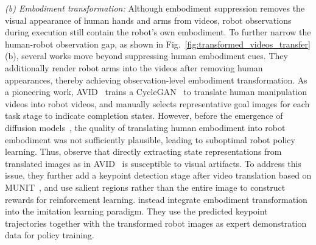 \documentclass[Afour,sageh,times]{sagej}
\begin{document}
\textit{(b) Embodiment transformation:} Although embodiment suppression removes the visual appearance of human hands and arms from videos, robot observations during execution still contain the robot's own embodiment. To further narrow the human-robot observation gap, as shown in Fig.~\ref{fig:transformed_videos_transfer}(b), several works move beyond suppressing human embodiment cues. They additionally render robot arms into the videos after removing human appearances, thereby achieving observation-level embodiment transformation. As a pioneering work, AVID~\citep{smith2020avid} trains a CycleGAN~\citep{zhu2017unpaired} to translate human manipulation videos into robot videos, and manually selects representative goal images for each task stage to indicate completion states. However, before the emergence of diffusion models~\citep{ho2020denoising,rombach2022high}, the quality of translating human embodiment into robot embodiment was not sufficiently plausible, leading to suboptimal robot policy learning. Thus, \cite{xiong2021learning} observe that directly extracting state representations from translated images as in AVID~\citep{smith2020avid} is susceptible to visual artifacts. To address this issue, they further add a keypoint detection stage after video translation based on MUNIT~\citep{huang2018multimodal}, and use salient regions rather than the entire image to construct rewards for reinforcement learning. \cite{sun2022learning} instead integrate embodiment transformation into the imitation learning paradigm. They use the predicted keypoint trajectories together with the transformed robot images as expert demonstration data for policy training. 
\end{document}
